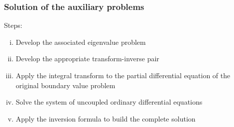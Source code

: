 \documentclass{beamer}
\begin{document}
\begin{frame}
	\frametitle{Solution of the auxiliary problems}
	
	Steps:
	
	\begin{enumerate}[(i)]
		\item Develop the associated eigenvalue problem
		\item Develop the appropriate transform-inverse pair
		\item Apply the integral transform to the partial differential equation of the original boundary value problem
		\item Solve the system of uncoupled ordinary differential equations
		\item Apply the inversion formula to build the complete solution
	\end{enumerate}
\end{frame}
%
%			
%			
%			
%			
%			
\end{document}
